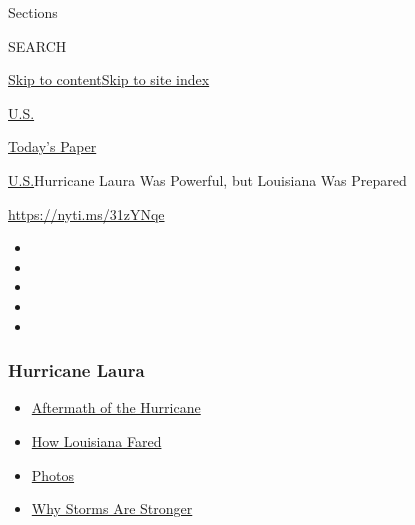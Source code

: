 Sections

SEARCH

\protect\hyperlink{site-content}{Skip to
content}\protect\hyperlink{site-index}{Skip to site index}

\href{https://www.nytimes3xbfgragh.onion/section/us}{U.S.}

\href{https://myaccount.nytimes3xbfgragh.onion/auth/login?response_type=cookie\&client_id=vi}{}

\href{https://www.nytimes3xbfgragh.onion/section/todayspaper}{Today's
Paper}

\href{/section/us}{U.S.}\textbar{}Hurricane Laura Was Powerful, but
Louisiana Was Prepared

\url{https://nyti.ms/31zYNqe}

\begin{itemize}
\item
\item
\item
\item
\item
\end{itemize}

\hypertarget{hurricane-laura}{%
\subsubsection{Hurricane Laura}\label{hurricane-laura}}

\begin{itemize}
\tightlist
\item
  \href{https://www.nytimes3xbfgragh.onion/2020/08/27/us/hurricane-laura-update.html?name=styln-hurricanes\&region=TOP_BANNER\&block=storyline_menu_recirc\&action=click\&pgtype=Article\&impression_id=825d0c90-f290-11ea-846f-7542dfffcf40\&variant=undefined}{Aftermath
  of the Hurricane}
\item
  \href{https://www.nytimes3xbfgragh.onion/2020/08/28/us/hurricane-laura-damage-lake-charles.html?name=styln-hurricanes\&region=TOP_BANNER\&block=storyline_menu_recirc\&action=click\&pgtype=Article\&impression_id=825d0c91-f290-11ea-846f-7542dfffcf40\&variant=undefined}{How
  Louisiana Fared}
\item
  \href{https://www.nytimes3xbfgragh.onion/2020/08/27/us/hurricane-laura-photos.html?name=styln-hurricanes\&region=TOP_BANNER\&block=storyline_menu_recirc\&action=click\&pgtype=Article\&impression_id=825d0c92-f290-11ea-846f-7542dfffcf40\&variant=undefined}{Photos}
\item
  \href{https://www.nytimes3xbfgragh.onion/2020/05/18/climate/climate-changes-hurricane-intensity.html?name=styln-hurricanes\&region=TOP_BANNER\&block=storyline_menu_recirc\&action=click\&pgtype=Article\&impression_id=825d33a0-f290-11ea-846f-7542dfffcf40\&variant=undefined}{Why
  Storms Are Stronger}
\end{itemize}

